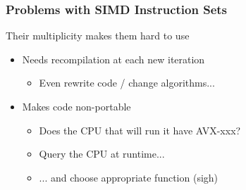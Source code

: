 \documentclass[xcolor={x11names,svgnames}]{beamer}
\begin{document}

\begin{frame}
  \frametitle{Problems with SIMD Instruction Sets}

  Their multiplicity makes them hard to use

  \bigskip
  
  \begin{itemize}
  \item Needs recompilation at each new iteration
    \begin{itemize}
    \item Even rewrite code / change algorithms... 
    \end{itemize}

    \medskip
    
  \item Makes code non-portable
    \begin{itemize}
    \item Does the CPU that will run it have AVX-xxx?
    \item Query the CPU \alert{at runtime}...
    \item ... and choose appropriate function (sigh)
    \end{itemize}
    
  \end{itemize}
\end{frame}

\end{document}
